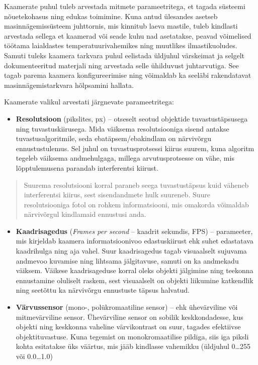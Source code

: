 \documentclass[12pt,a4paper]{report}
\begin{document}
Kaamerate puhul tuleb arvestada mitmete parameetritega, et tagada süsteemi nõuetekohasus ning edukas toimimine. Kuna antud ülesandes asetseb masinnägemissüsteem juhttornis, mis kinnitub laeva mastile, tuleb kindlasti arvestada sellega et kaamerad või seade kuhu nad asetatakse, peavad võimelised töötama laialdastes temperatuurivahemikes ning muutlikes ilmastikuoludes. Samuti tuleks kaamera tarkvara puhul eelistada üldjuhul värskeimat ja selgelt dokumenteeritud materjali ning arvestada selle ühilduvust juhtarvutiga. See tagab parema kaamera konfigureerimise ning võimaldab ka seeläbi rakendatavat masinnägemistarkvara hõlpsamini hallata.

Kaamerate valikul arvestati järgnevate parameetritega:

\begin{itemize}
\item
  \textbf{Resolutsioon} (pikslites, px) -- otseselt seotud objektide tuvastustäpsusega ning tuvastuskiirusega. Mida väiksema resolutsiooniga sisend antakse tuvastusalgoritmile, seda ebatäpsem/ebakindlam on närvivõrgu ennustustulemus. Sel juhul on tuvastusprotsessi kiirus suurem, kuna algoritm tegeleb väiksema andmehulgaga, millega arvutusprotsesse on vähe, mis lõpptulemusena parandab interferentsi kiirust.
\end{itemize}

\begin{quote}
Suurema resolutsiooni korral paraneb seega tuvastustäpsus kuid väheneb interferentsi kiirus, sest sisendandmete hulk suureneb. Suure resolutsiooniga fotol on rohkem informatsiooni, mis omakorda võimaldab närvivõrgul kindlamaid ennustusi anda.
\end{quote}

\begin{itemize}
\item
  \textbf{Kaadrisagedus} (\emph{Frames per second} -- kaadrit sekundis, FPS) -- parameeter, mis kirjeldab kaamera informatsioonivoo edastuskiirust ehk suhet edastatava kaadrihulga ning aja vahel. Suur kaadrisagedus tagab visuaalselt sujuvama andmevoo kuvamise ning lihtsama jälgitavuse, samuti on ka andmekadu väiksem. Väikese kaadrisageduse korral oleks objekti jälgimine ning teekonna ennustamine oluliselt raskem, sest visuaalselt on objekti liikumine katkendlik ning seetõttu ka närvivõrgu ennustuste täpsus halvatud.
\item
  \textbf{Värvussensor} (mono-, polükromaatiline sensor) -- ehk ühevärviline või mitmevärviline sensor. Ühevärviline sensor on sobilik keskkondadesse, kus objekti ning keskkonna vaheline värvikontrast on suur, tagades efektiivse objektituvastuse. Kuna tegemist on monokromaatilise pildiga, siis iga piksli kohta esitatakse üks väärtus, mis jääb kindlasse vahemikku (üldjuhul 0\ldots255 või 0.0\ldots1.0)
\end{itemize}
\end{document}

